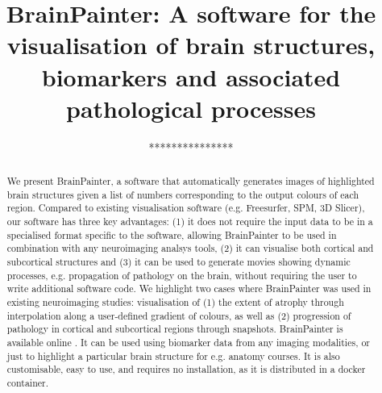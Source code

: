 \documentclass{llncs}
\begin{document}
\title{BrainPainter: A software for the visualisation of brain structures, biomarkers and associated pathological processes}
%
%


\author{***************}

\authorrunning{} %

\institute{***************}



\maketitle              %


\newcommand{\expFld}{.}


\begin{abstract}
We present BrainPainter, a software that automatically generates images of highlighted brain structures given a list of numbers corresponding to the output colours of each region. Compared to existing visualisation software (e.g. Freesurfer, SPM, 3D Slicer), our software has three key advantages: (1) it does not require the input data to be in a specialised format specific to the software, allowing BrainPainter to be used in combination with any neuroimaging analsys tools, (2) it can visualise both cortical and subcortical structures and (3) it can be used to generate movies showing dynamic processes, e.g. propagation of pathology on the brain, without requiring the user to write additional software code. We highlight two cases where BrainPainter was used in existing neuroimaging studies: visualisation of (1) the extent of atrophy through interpolation along a user-defined gradient of colours, as well as (2) progression of pathology in cortical and subcortical regions through snapshots. BrainPainter is available online \cite{brainPainter}. It can be used using biomarker data from any imaging modalities, or just to highlight a particular brain structure for e.g. anatomy courses. It is also customisable, easy to use, and requires no installation, as it is distributed in a docker container.

\end{abstract}
\end{document}
